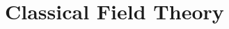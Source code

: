 \documentclass[main.tex]{subfiles}
\begin{document}
\chapter{Classical Field Theory}
\end{document}
